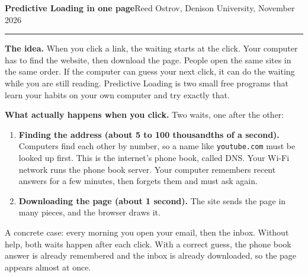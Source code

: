 \documentclass[10pt]{article}
\begin{document}
{\Large\textbf{Predictive Loading in one page}}\hfill Reed Ostrov, Denison University, November 2026\\[-2pt]
\rule{\textwidth}{0.4pt}

\textbf{The idea.} When you click a link, the waiting starts at the click. Your computer has to find the website, then download the page. People open the same sites in the same order. If the computer can guess your next click, it can do the waiting while you are still reading. Predictive Loading is two small free programs that learn your habits on your own computer and try exactly that.

\textbf{What actually happens when you click.} Two waits, one after the other:
\begin{enumerate}
\item \textbf{Finding the address (about 5 to 100 thousandths of a second).} Computers find each other by number, so a name like \texttt{youtube.com} must be looked up first. This is the internet's phone book, called DNS. Your Wi-Fi network runs the phone book server. Your computer remembers recent answers for a few minutes, then forgets them and must ask again.
\item \textbf{Downloading the page (about 1 second).} The site sends the page in many pieces, and the browser draws it.
\end{enumerate}
A concrete case: every morning you open your email, then the inbox. Without help, both waits happen after each click. With a correct guess, the phone book answer is already remembered and the inbox is already downloaded, so the page appears almost at once.
\end{document}

